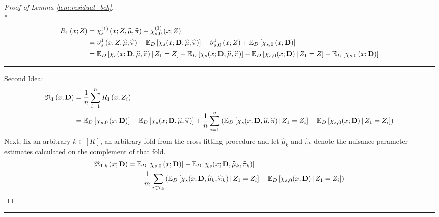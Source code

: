 \begin{proof}[Proof of Lemma \ref{lem:residual_beh}]\mbox{}\\*
    \begin{equation}
        \begin{aligned}
            R_{1}\left(x; Z\right)
            & = \chi_{s}^{(1)}\left(x; Z, \widehat{\mu}, \widehat{\pi}\right) - \chi_{s,0}^{(1)}\left(x; Z\right) \\
            & = \vartheta_{s}^{1}\left(x; Z, \widehat{\mu}, \widehat{\pi}\right)
            - \mathbb{E}_{D}\left[\chi_{s}(x; \mathbf{D}, \widehat{\mu}, \widehat{\pi})\right]
            - \vartheta_{s,0}^{1}\left(x; Z\right) 
            + \mathbb{E}_{D}\left[\chi_{s,0}\left(x; \mathbf{D}\right)\right]\\
            & = \mathbb{E}_{D}\left[\chi_{s}(x; \mathbf{D}, \widehat{\mu}, \widehat{\pi}) \, \middle| \, Z_1 = Z \right]
             - \mathbb{E}_{D}\left[\chi_{s}(x; \mathbf{D}, \widehat{\mu}, \widehat{\pi})\right]
            - \mathbb{E}_{D}\left[\chi_{s,0}(x; \mathbf{D}) \, \middle| \, Z_1 = Z \right]
            + \mathbb{E}_{D}\left[\chi_{s,0}\left(x; \mathbf{D}\right)\right]\\
        \end{aligned}
    \end{equation}    

    \hrule 

    Second Idea:
    \begin{equation}
        \begin{aligned}
            \mathfrak{R}_{1}\left(x; \mathbf{D}\right)
            & = \frac{1}{n}\sum_{i = 1}^{n} R_{1}\left(x; Z_{i}\right) \\
            & = \mathbb{E}_{D}\left[\chi_{s,0}\left(x; \mathbf{D}\right)\right]
            - \mathbb{E}_{D}\left[\chi_{s}(x; \mathbf{D}, \widehat{\mu}, \widehat{\pi})\right]
            + \frac{1}{n}\sum_{i = 1}^{n}\left(\mathbb{E}_{D}\left[\chi_{s}(x; \mathbf{D}, \widehat{\mu}, \widehat{\pi}) \, \middle| \, Z_1 = Z_i \right]
            - \mathbb{E}_{D}\left[\chi_{s,0}(x; \mathbf{D}) \, \middle| \, Z_1 = Z_i \right]\right)
        \end{aligned}
    \end{equation}
     Next, fix an arbitrary $k \in [K]$, an arbitrary fold from the cross-fitting procedure and let $\hat{\mu}_{k}$ and $\hat{\pi}_{k}$ denote the nuisance parameter estimates calculated on the complement of that fold.
    \begin{equation}
        \begin{aligned}
            \mathfrak{R}_{1,k}\left(x; \mathbf{D}\right)
            & = \mathbb{E}_{D}\left[\chi_{s,0}\left(x; \mathbf{D}\right)\right]
            - \mathbb{E}_{D}\left[\chi_{s}(x; \mathbf{D}, \widehat{\mu}_k, \widehat{\pi}_k)\right]\\
            & \quad + \frac{1}{m}\sum_{i \in \mathcal{I}_{k}}\left(\mathbb{E}_{D}\left[\chi_{s}(x; \mathbf{D}, \widehat{\mu}_k, \widehat{\pi}_k) \, \middle| \, Z_1 = Z_i \right]
            - \mathbb{E}_{D}\left[\chi_{s,0}(x; \mathbf{D}) \, \middle| \, Z_1 = Z_i \right]\right)
        \end{aligned}
    \end{equation}
\end{proof}

\hrule